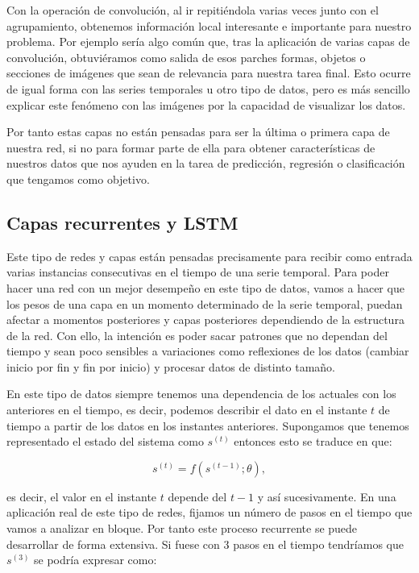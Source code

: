 Con la operación de convolución, al ir repitiéndola varias veces junto con el agrupamiento, obtenemos información local interesante e importante para nuestro problema. Por ejemplo sería algo común que, tras la aplicación de varias capas de convolución, obtuviéramos como salida de esos parches formas, objetos o secciones de imágenes que sean de relevancia para nuestra tarea final. Esto ocurre de igual forma con las series temporales u otro tipo de datos, pero es más sencillo explicar este fenómeno con las imágenes por la capacidad de visualizar los datos.

Por tanto estas capas no están pensadas para ser la última o primera capa de nuestra red, si no para formar parte de ella para obtener características de nuestros datos que nos ayuden en la tarea de predicción, regresión o clasificación que tengamos como objetivo.

\subsection{Capas recurrentes y LSTM}

Este tipo de redes y capas están pensadas precisamente para recibir como entrada varias instancias consecutivas en el tiempo de una serie temporal. Para poder hacer una red con un mejor desempeño en este tipo de datos, vamos a hacer que los pesos de una capa en un momento determinado de la serie temporal, puedan afectar a momentos posteriores y capas posteriores dependiendo de la estructura de la red. Con ello, la intención es poder sacar patrones que no dependan del tiempo y sean poco sensibles a variaciones como reflexiones de los datos (cambiar inicio por fin y fin por inicio) y procesar datos de distinto tamaño.

En este tipo de datos siempre tenemos una dependencia de los actuales con los anteriores en el tiempo, es decir, podemos describir el dato en el instante $t$ de tiempo a partir de los datos en los instantes anteriores. Supongamos que tenemos representado el estado del sistema como $s^{(t)}$ entonces esto se traduce en que:

$$s^{(t)} = f(s^{(t-1)};\theta),$$

es decir, el valor en el instante $t$ depende del $t-1$ y así sucesivamente. En una aplicación real de este tipo de redes, fijamos un número de pasos en el tiempo que vamos a analizar en bloque. Por tanto este proceso recurrente se puede desarrollar de forma extensiva. Si fuese con 3 pasos en el tiempo tendríamos que $s^{(3)}$ se podría expresar como:

